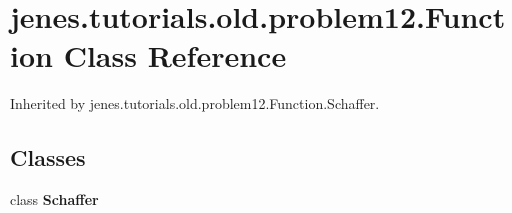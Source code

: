 \hypertarget{classjenes_1_1tutorials_1_1old_1_1problem12_1_1_function}{\section{jenes.\-tutorials.\-old.\-problem12.\-Function Class Reference}
\label{classjenes_1_1tutorials_1_1old_1_1problem12_1_1_function}
}


Inherited by jenes.\-tutorials.\-old.\-problem12.\-Function.\-Schaffer.

\subsection*{Classes}
\begin{DoxyCompactItemize}
\item 
class {\bfseries Schaffer}
\end{DoxyCompactItemize}
